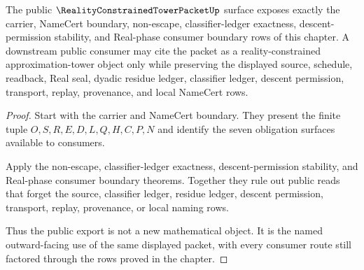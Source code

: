 \begin{theorem}
\label{thm:reality-constrained-tower-packet-public-export}
The public $\RealityConstrainedTowerPacketUp$ surface exposes exactly the carrier, NameCert boundary, non-escape, classifier-ledger exactness, descent-permission stability, and Real-phase consumer boundary rows of this chapter. A downstream public consumer may cite the packet as a reality-constrained approximation-tower object only while preserving the displayed source, schedule, readback, Real seal, dyadic residue ledger, classifier ledger, descent permission, transport, replay, provenance, and local NameCert rows.
\end{theorem}
\begin{proof}
Start with the carrier and NameCert boundary. They present the finite tuple $O,S,R,E,D,L,Q,H,C,P,N$ and identify the seven obligation surfaces available to consumers.

Apply the non-escape, classifier-ledger exactness, descent-permission stability, and Real-phase consumer boundary theorems. Together they rule out public reads that forget the source, classifier ledger, residue ledger, descent permission, transport, replay, provenance, or local naming rows.

Thus the public export is not a new mathematical object. It is the named outward-facing use of the same displayed packet, with every consumer route still factored through the rows proved in the chapter.
\end{proof}


